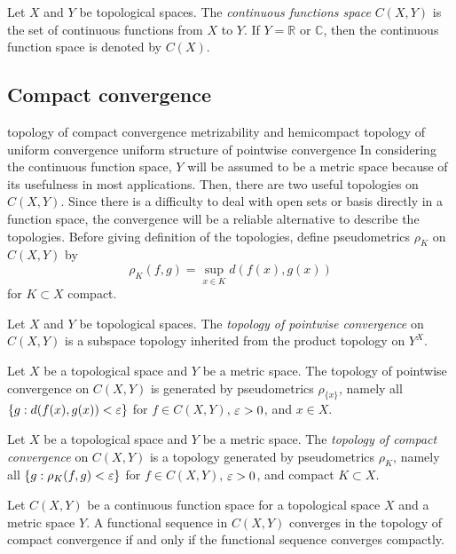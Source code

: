 \documentclass{../crs}
\begin{document}
\begin{defn}
Let $X$ and $Y$ be topological spaces.
The \emph{continuous functions space} $C(X,Y)$ is the set of continuous functions from $X$ to $Y$.
If $Y=\mathbb{R}$ or $\mathbb{C}$, then the continuous function space is denoted by $C(X)$.
\end{defn}

\subsection{Compact convergence}
topology of compact convergence
metrizability and hemicompact
topology of uniform convergence
uniform structure of pointwise convergence
In considering the continuous function space, $Y$ will be assumed to be a metric space because of its usefulness in most applications.
Then, there are two useful topologies on $C(X,Y)$.
Since there is a difficulty to deal with open sets or basis directly in a function space, the convergence will be a reliable alternative to describe the topologies.
Before giving definition of the topologies, define pseudometrics $\rho_K$ on $C(X,Y)$ by
\[\rho_K(f,g)=\sup_{x\in K}d(f(x),g(x))\]
for $K\subset X$ compact.

\begin{defn}
Let $X$ and $Y$ be topological spaces.
The \emph{topology of pointwise convergence} on $C(X,Y)$ is a subspace topology inherited from the product topology on $Y^X$.
\end{defn}

\begin{prop}
Let $X$ be a topological space and $Y$ be a metric space.
The topology of pointwise convergence on $C(X,Y)$ is generated by pseudometrics $\rho_{\{x\}}$, namely all $\{g:d(f(x),g(x))<\varepsilon\}$ for $f\in C(X,Y)$, $\varepsilon>0$, and $x\in X$.
\end{prop}

\begin{defn}
Let $X$ be a topological space and $Y$ be a metric space.
The \emph{topology of compact convergence} on $C(X,Y)$ is a topology generated by pseudometrics $\rho_K$, namely all $\{g:\rho_K(f,g)<\varepsilon\}$ for $f\in C(X,Y)$, $\varepsilon>0$, and compact $K\subset X$.
\end{defn}

\begin{prop}
Let $C(X,Y)$ be a continuous function space for a topological space $X$ and a metric space $Y$.
A functional sequence in $C(X,Y)$ converges in the topology of compact convergence if and only if the functional sequence converges compactly.
\end{prop}
\end{document}
